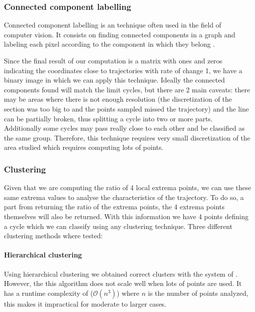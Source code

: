 \subsubsection*{Connected component labelling}


Connected component labelling is an technique often used in the field of computer
vision. It consists on finding connected components in a graph and labeling each pixel
according to the component in which they belong \cite{shapiro_connected_1996}.

Since the final result of our computation is a matrix with ones and zeros
indicating the coordinates close to trajectories with rate of change 1, we have
a binary image in which we can apply this technique. Ideally the connected
components found will match the limit cycles, but there are 2 main caveats:
there may be areas where there is not enough resolution (the discretization of
the section was too big to and the points sampled missed the trajectory) and the
line can be partially broken, thus splitting a cycle into two or more parts.
Additionally some cycles may pass really close to each other and be classified
as the same group. Therefore, this technique requires very small discretization
of the area studied which requires computing lots of points.

\subsubsection*{Clustering}
Given that we are computing the ratio of 4 local extrema points, we can use
these same extrema values to analyse the characteristics of the trajectory. To
do so, a part from returning the ratio of the extrema points, the 4 extrema
points themselves will also be returned. With this information we have 4 points
defining a cycle which we can classify using any clustering technique. Three
different clustering methods where tested:

\paragraph{Hierarchical clustering}

Using hierarchical clustering we obtained correct clusters with the system of
\cite{kuznetsov_visualization_2013}. However, the this algorithm does not scale
well when lots of points are used. It has a runtime complexity of
($\mathcal{O}(n^3)$) where $n$ is the number of points analyzed, this makes it
impractical for moderate to larger cases.

